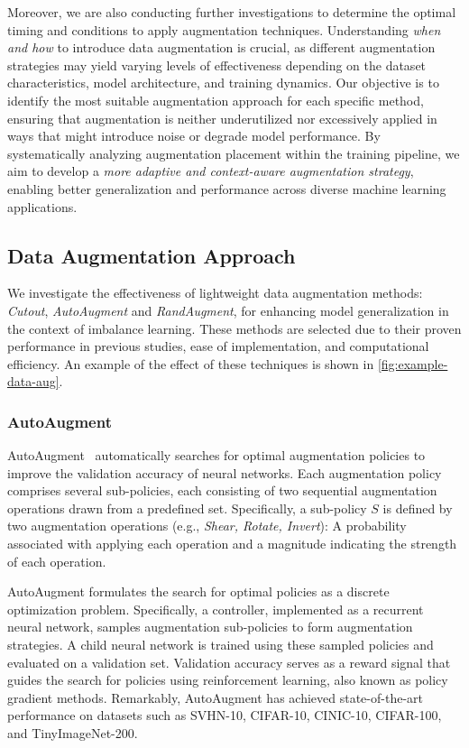 Moreover, we are also conducting further investigations to determine the optimal timing and conditions to apply augmentation techniques. Understanding\textit{ when and how} to introduce data augmentation is crucial, as different augmentation strategies may yield varying levels of effectiveness depending on the dataset characteristics, model architecture, and training dynamics. Our objective is to identify the most suitable augmentation approach for each specific method, ensuring that augmentation is neither underutilized nor excessively applied in ways that might introduce noise or degrade model performance. By systematically analyzing augmentation placement within the training pipeline, we aim to develop a \textit{more adaptive and context-aware augmentation strategy}, enabling better generalization and performance across diverse machine learning applications.

\subsection{Data Augmentation Approach}
We investigate the effectiveness of lightweight data augmentation methods: \textit{Cutout}, \textit{AutoAugment} and \textit{RandAugment}, for enhancing model generalization in the context of imbalance learning. These methods are selected due to their proven performance in previous studies, ease of implementation, and computational efficiency. An example of the effect of these techniques is shown in \ref{fig:example-data-aug}.

\subsubsection{AutoAugment}
AutoAugment~\cite{cubuk2018autoaugment} automatically searches for optimal augmentation policies to improve the validation accuracy of neural networks. Each augmentation policy comprises several sub-policies, each consisting of two sequential augmentation operations drawn from a predefined set. Specifically, a sub-policy \(S\) is defined by two augmentation operations (e.g., \textit{Shear, Rotate, Invert}): A probability associated with applying each operation and a magnitude indicating the strength of each operation.

AutoAugment formulates the search for optimal policies as a discrete optimization problem. Specifically, a controller, implemented as a recurrent neural network, samples augmentation sub-policies to form augmentation strategies. A child neural network is trained using these sampled policies and evaluated on a validation set. Validation accuracy serves as a reward signal that guides the search for policies using reinforcement learning, also known as policy gradient methods. Remarkably, AutoAugment has achieved state-of-the-art performance on datasets such as SVHN-10, CIFAR-10, CINIC-10, CIFAR-100, and TinyImageNet-200.

